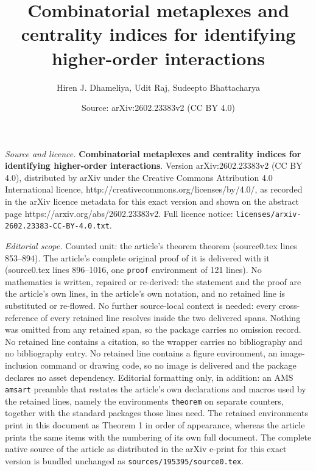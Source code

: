\documentclass[10pt,a4paper]{amsart}
\title{\textbf{Combinatorial metaplexes and centrality indices for identifying higher-order interactions}}
\author{Hiren J. Dhameliya, Udit Raj, Sudeepto Bhattacharya}
\date{Source: arXiv:2602.23383v2 (CC BY 4.0)}
\begin{document}
\maketitle

\noindent\emph{Source and licence.} \textbf{Combinatorial metaplexes and centrality indices for identifying higher-order interactions}. Version arXiv:2602.23383v2 (CC BY 4.0), distributed by arXiv under the Creative Commons Attribution 4.0 International licence, http://creativecommons.org/licenses/by/4.0/, as recorded in the arXiv licence metadata for this exact version and shown on the abstract page https://arxiv.org/abs/2602.23383v2. Full licence notice: \texttt{licenses/arxiv-2602.23383-CC-BY-4.0.txt}.\par\smallskip

\noindent\textit{Editorial scope.} Counted unit: the article's theorem theorem (source0.tex lines 853--894). The article's complete original proof of it is delivered with it (source0.tex lines 896--1016, one \texttt{proof} environment of 121 lines). No mathematics is written, repaired or re-derived: the statement and the proof are the article's own lines, in the article's own notation, and no retained line is substituted or re-flowed.  No further source-local context is needed: every cross-reference of every retained line resolves inside the two delivered spans.  Nothing was omitted from any retained span, so the package carries no omission record.  No retained line contains a citation, so the wrapper carries no bibliography and no bibliography entry.  No retained line contains a figure environment, an image-inclusion command or drawing code, so no image is delivered and the package declares no asset dependency.  Editorial formatting only, in addition: an AMS \texttt{amsart} preamble that restates the article's own declarations and macros used by the retained lines, namely the environments \texttt{theorem} on separate counters, together with the standard packages those lines need.  The retained environments print in this document as Theorem 1 in order of appearance, whereas the article prints the same items with the numbering of its own full document.  The complete native source of the article as distributed in the arXiv e-print for this exact version is bundled unchanged as \texttt{sources/195395/source0.tex}.
\end{document}
